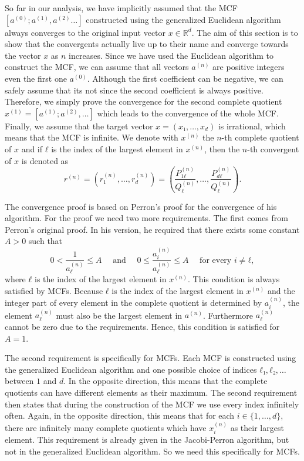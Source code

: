 So far in our analysis, we have implicitly assumed that the MCF $[a^{(0)}; a^{(1)}, a^{(2)} …]$
constructed using the generalized Euclidean algorithm always converges to the
original input vector $x ∈ ℝ^d$.
The aim of this section is to show that the convergents actually live up to
their name and converge towards the vector $x$ as $n$ increases.
Since we have used the Euclidean algorithm to construct the MCF,
we can assume that all vectors $a^{(n)}$ are positive integers even the first
one $a^{(0)}$.
Although the first coefficient can be negative, we can safely assume that its
not since the second coefficient is always positive.
Therefore, we simply prove the convergence for the second complete quotient $x^{(1)} =
[a^{(1)}; a^{(2)}, …]$ which leads to the convergence of the whole MCF.
Finally, we assume that the target vector $x = (x₁, …, x_d)$ is irrational,
which means that the MCF is infinite.
We denote with $x^{(n)}$ the $n$-th complete quotient of $x$
and if $ℓ$ is the index of the largest element in $x^{(n)}$,
then the $n$-th convergent of $x$ is denoted as
\[
  r^{(n)}
  = (r_1^{(n)}, …, r_d^{(n)})
  = \left( \frac{P_{1ℓ}^{(n)}}{Q_{ℓ}^{(n)}}, \dots, \frac{P_{dℓ}^{(n)}}{Q_{ℓ}^{(n)}} \right).
\]

The convergence proof is based on Perron's proof \cite{Perron07} for the convergence of his algorithm.
For the proof we need two more requirements.
The first comes from Perron's original proof.
In his version, he required that there exists some constant $A > 0$ such that
\[
  0 < \frac{1}{a_{ℓ}^{(n)}} ≤ A
  \quad \text{ and } \quad
  0 ≤ \frac{a_i^{(n)}}{a_{ℓ}^{(n)}} ≤ A \quad \text{ for every } i ≠ ℓ,
\]
where $ℓ$ is the index of the largest element in $x^{(n)}$.
This condition is always satisfied by MCFs.
Because $ℓ$ is the index of the largest element in $x^{(n)}$
and the integer part of every element in the complete quotient is determined by $a_i^{(n)}$,
the element $a_ℓ^{(n)}$ must also be the largest element in $a^{(n)}$.
Furthermore $a_ℓ^{(n)}$ cannot be zero due to the requirements.
Hence, this condition is satisfied for $A = 1$.

The second requirement is specifically for MCFs.
Each MCF is constructed using the generalized Euclidean algorithm and one
possible choice of indices $ℓ₁, ℓ₂, …$ between $1$ and $d$.
In the opposite direction, this means that the complete quotients can have different elements as their maximum.
The second requirement then states that during the construction of the MCF
we use every index infinitely often.
Again, in the opposite direction, this means that for each $i ∈ \{1, …, d\}$,
there are infinitely many complete quotients which have $x_i^{(n)}$ as their
largest element.
This requirement is already given in the Jacobi-Perron algorithm,
but not in the generalized Euclidean algorithm.
So we need this specifically for MCFs.

